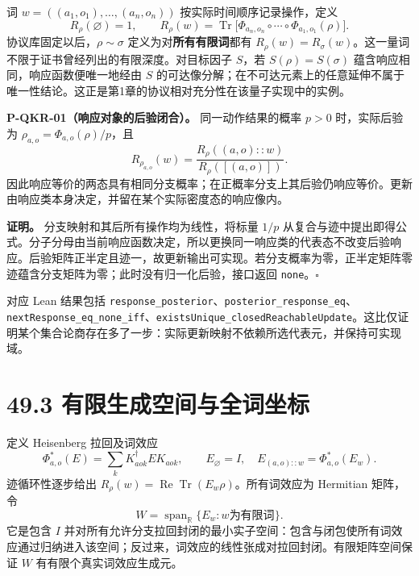 \documentclass[
  11pt,
  oneside]{book}
\begin{document}
词 \(w=((a_1,o_1),\ldots,(a_n,o_n))\) 按实际时间顺序记录操作，定义 \[
R_\rho(\varnothing)=1,\qquad
R_\rho(w)=\operatorname{Tr}\bigl[\Phi_{a_n,o_n}\circ\cdots\circ\Phi_{a_1,o_1}(\rho)\bigr].
\] 协议库固定以后，\(\rho\sim\sigma\) 定义为对\textbf{所有有限词}都有
\(R_\rho(w)=R_\sigma(w)\)。这一量词不限于证书曾经列出的有限深度。对目标因子
\(S\)，若 \(S(\rho)=S(\sigma)\) 蕴含响应相同，响应函数便唯一地经由 \(S\)
的可达像分解；在不可达元素上的任意延伸不属于唯一性结论。这正是第1章的协议相对充分性在该量子实现中的实例。

\protect\hypertarget{p-qkr-01}{}{}

\textbf{P-QKR-01（响应对象的后验闭合）。} 同一动作结果的概率 \(p>0\)
时，实际后验为 \(\rho_{a,o}=\Phi_{a,o}(\rho)/p\)，且 \[
R_{\rho_{a,o}}(w)=\frac{R_\rho((a,o)::w)}{R_\rho([(a,o)])}.
\]
因此响应等价的两态具有相同分支概率；在正概率分支上其后验仍响应等价。更新由响应类本身决定，并留在某个实际密度态的响应像内。

\textbf{证明。} 分支映射和其后所有操作均为线性，将标量 \(1/p\)
从复合与迹中提出即得公式。分子分母由当前响应函数决定，所以更换同一响应类的代表态不改变后验响应。后验矩阵正半定且迹一，故更新输出可实现。若分支概率为零，正半定矩阵零迹蕴含分支矩阵为零；此时没有归一化后验，接口返回
\texttt{none}。\(\square\)

对应 Lean 结果包括
\texttt{response\_\allowbreak posterior}、\allowbreak \texttt{posterior\_\allowbreak response\_\allowbreak eq}、\allowbreak \texttt{nextResponse\_\allowbreak eq\_\allowbreak none\_\allowbreak iff}、\allowbreak \texttt{existsUnique\_\allowbreak closedReachableUpdate}。这比仅证明某个集合论商存在多了一步：实际更新映射不依赖所选代表元，并保持可实现域。

\hypertarget{ux6709ux9650ux751fux6210ux7a7aux95f4ux4e0eux5168ux8bcdux5750ux6807}{%
\section{49.3
有限生成空间与全词坐标}\label{ux6709ux9650ux751fux6210ux7a7aux95f4ux4e0eux5168ux8bcdux5750ux6807}}

定义 Heisenberg 拉回及词效应 \[
\Phi_{a,o}^*(E)=\sum_kK_{aok}^{\dagger}EK_{aok},\qquad
E_{\varnothing}=I,\quad E_{(a,o)::w}=\Phi_{a,o}^*(E_w).
\] 迹循环性逐步给出
\(R_\rho(w)=\operatorname{Re}\operatorname{Tr}(E_w\rho)\)。所有词效应为
Hermitian 矩阵，令 \[
W=\operatorname{span}_{\mathbb R}\{E_w:w\text{为有限词}\}.
\] 它是包含 \(I\)
并对所有允许分支拉回封闭的最小实子空间：包含与闭包使所有词效应通过归纳进入该空间；反过来，词效应的线性张成对拉回封闭。有限矩阵空间保证
\(W\) 有有限个真实词效应生成元。
\end{document}
